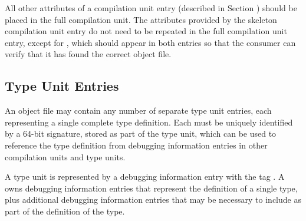 All other attributes of a compilation unit entry (described
in Section ) 
should be placed in the full compilation unit.
The attributes provided by the skeleton compilation
unit entry do not need to be repeated in the full compilation
unit entry, except for \DWATdwoid, which should appear in
both entries so that the consumer can verify that it has
found the correct object file.

\subsection{Type Unit Entries}
\label{chap:typeunitentries}
An object file may contain any number of separate type
unit entries, each representing a single complete type
definition. 
Each  must be uniquely identified by
a 64-bit signature, stored as part of the type unit, which
can be used to reference the type definition from debugging
information entries in other compilation units and type units.

A type unit is represented by a debugging information entry
with the tag \DWTAGtypeunitTARG. 
A  owns debugging
information entries that represent the definition of a single
type, plus additional debugging information entries that may
be necessary to include as part of the definition of the type.

